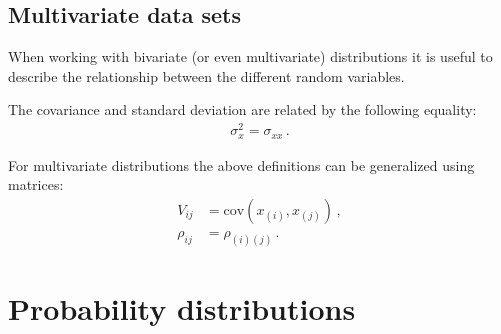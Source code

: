 \subsection{Multivariate data sets}

    When working with bivariate (or even multivariate) distributions it is useful to describe the relationship between the different random variables.

    \begin{property}
        The covariance and standard deviation are related by the following equality:
        \begin{gather}
            \sigma_x^2 = \sigma_{xx}\,.
        \end{gather}
    \end{property}

    \begin{remark}
        For multivariate distributions the above definitions can be generalized using matrices:
        \begin{align}
            \label{statistics:covariance_matrix}
            V_{ij} &= \mathrm{cov}(x_{(i)},x_{(j)})\,,\\
            \label{statistics:correlation_matrix}
            \rho_{ij} &= \rho_{(i)(j)}\,.
        \end{align}
    \end{remark}

\section{Probability distributions}


